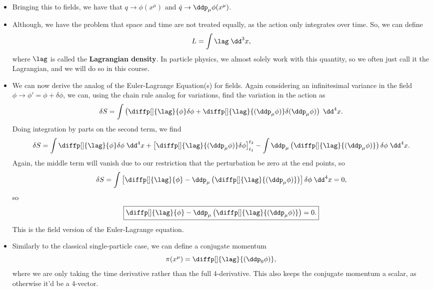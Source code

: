 \begin{itemize}
    \item Bringing this to fields, we have that $q \rightarrow \phi(x^{\mu})$ and $\dot{q} \rightarrow \ddp_{\mu}\phi(x^{\mu})$.
    \item Although, we have the problem that space and time are not treated equally, as the action only integrates over time. So, we can define
        \begin{equation}
            L = \int \lag \;\dd^3 x,
        \end{equation}
        where $\lag$ is called the \textbf{Lagrangian density}. In particle physics, we almost solely work with this quantity, so we often just call it the Lagrangian, and we will do so in this course.
    \item We can now derive the analog of the Euler-Lagrange Equation(s) for fields. Again considering an infinitesimal variance in the field $\phi \rightarrow \phi' = \phi + \delta\phi$, we can, using the chain rule analog for variations, find the variation in the action as
        \begin{equation*}
            \delta S = \int \left(\diffp[]{\lag}{\phi}\delta\phi + \diffp[]{\lag}{(\ddp_{\mu}\phi)}\delta(\ddp_{\mu}\phi)\right) \;\dd^4 x.
        \end{equation*}
        Doing integration by parts on the second term, we find
        \begin{equation*}
            \delta S = \int \diffp[]{\lag}{\phi}\delta\phi \;\dd^4 x + \left[\diffp[]{\lag}{(\ddp_{\mu}\phi)}\delta\phi\right]_{t_1}^{t_2} - \int \ddp_{\mu} \left(\diffp[]{\lag}{(\ddp_{\mu}\phi)}\right)\delta\phi \;\dd^4 x.
        \end{equation*}
        Again, the middle term will vanish due to our restriction that the perturbation be zero at the end points, so
        \begin{equation*}
            \delta S = \int \left[\diffp[]{\lag}{\phi} - \ddp_{\mu}\left(\diffp[]{\lag}{(\ddp_{\mu}\phi)}\right)\right]\delta\phi \;\dd^4 x = 0,
        \end{equation*}
        so
        \begin{equation}
            \boxed{\diffp[]{\lag}{\phi} - \ddp_{\mu}\left(\diffp[]{\lag}{(\ddp_{\mu}\phi)}\right) = 0.}
        \end{equation}
        This is the field version of the Euler-Lagrange equation.
    \item Similarly to the classical single-particle case, we can define a conjugate momentum
        \begin{equation}
            \pi(x^{\mu}) = \diffp[]{\lag}{(\ddp_0 \phi)},
        \end{equation}
        where we are only taking the time derivative rather than the full 4-derivative. This also keeps the conjugate momentum a scalar, as otherwise it'd be a 4-vector.
\end{itemize}


